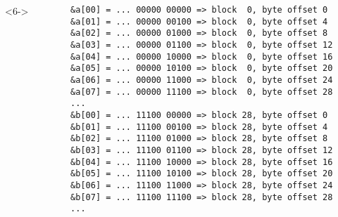 \documentclass[dvipsnames,presentation,aspectratio=169,14pt]{beamer}
\begin{document}
\begin{frame}[fragile]
\begin{columns}
\begin{column}{0.33\linewidth}
\begin{onlyenv}
      \end{onlyenv}%
      \begin{onlyenv}<6->
      \end{onlyenv}%
    \end{column}
    \begin{column}{0.45\linewidth}
\begin{verbatim}
&a[00] = ... 00000 00000 => block  0, byte offset 0
&a[01] = ... 00000 00100 => block  0, byte offset 4
&a[02] = ... 00000 01000 => block  0, byte offset 8
&a[03] = ... 00000 01100 => block  0, byte offset 12
&a[04] = ... 00000 10000 => block  0, byte offset 16
&a[05] = ... 00000 10100 => block  0, byte offset 20
&a[06] = ... 00000 11000 => block  0, byte offset 24
&a[07] = ... 00000 11100 => block  0, byte offset 28
...
&b[00] = ... 11100 00000 => block 28, byte offset 0
&b[01] = ... 11100 00100 => block 28, byte offset 4
&b[02] = ... 11100 01000 => block 28, byte offset 8
&b[03] = ... 11100 01100 => block 28, byte offset 12
&b[04] = ... 11100 10000 => block 28, byte offset 16
&b[05] = ... 11100 10100 => block 28, byte offset 20
&b[06] = ... 11100 11000 => block 28, byte offset 24
&b[07] = ... 11100 11100 => block 28, byte offset 28
...
\end{verbatim}
    \end{column}
  \end{columns}
\end{frame}
\end{document}
